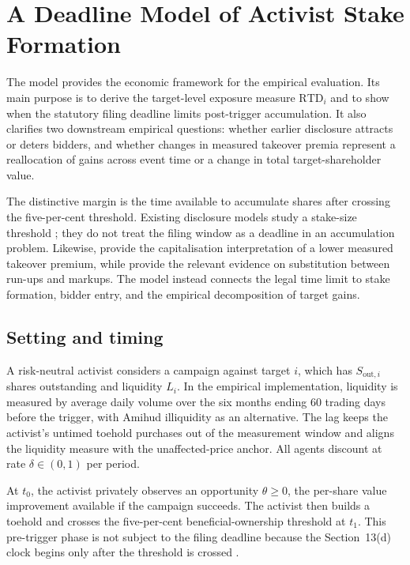 \section{A Deadline Model of Activist Stake Formation}
\label{sec:model}

The model provides the economic framework for the empirical evaluation. Its
main purpose is to derive the target-level exposure measure
$\mathrm{RTD}_i$ and to show when the statutory filing deadline limits
post-trigger accumulation. It also clarifies two downstream empirical
questions: whether earlier disclosure attracts or deters bidders, and whether
changes in measured takeover premia represent a reallocation of gains across
event time or a change in total target-shareholder value.

The distinctive margin is the time available to accumulate shares after
crossing the five-per-cent threshold. Existing disclosure models study a
stake-size threshold \parencite{ordonezcalafibernhardt2022}; they do not treat
the filing window as a deadline in an accumulation problem. Likewise,
\textcite{celentanolevine2025} provide the capitalisation interpretation of a
lower measured takeover premium, while \textcite{bett2014} provide the relevant
evidence on substitution between run-ups and markups. The model instead
connects the legal time limit to stake formation, bidder entry, and the
empirical decomposition of target gains.

\subsection{Setting and timing}
\label{sec:model-env}

A risk-neutral activist considers a campaign against target $i$, which has
$S_{\mathrm{out},i}$ shares outstanding and liquidity $L_i$. In the empirical
implementation, liquidity is measured by average daily volume over the six
months ending 60 trading days before the trigger, with Amihud illiquidity as an
alternative. The lag keeps the activist's untimed toehold purchases out of the
measurement window and aligns the liquidity measure with the unaffected-price
anchor. All agents discount at rate $\delta\in(0,1)$ per period.

At $t_0$, the activist privately observes an opportunity $\theta\geq0$, the
per-share value improvement available if the campaign succeeds. The activist
then builds a toehold and crosses the five-per-cent beneficial-ownership
threshold at $t_1$. This pre-trigger phase is not subject to the filing deadline
because the Section~13(d) clock begins only after the threshold is crossed
\parencite{sec2023modernization}.

